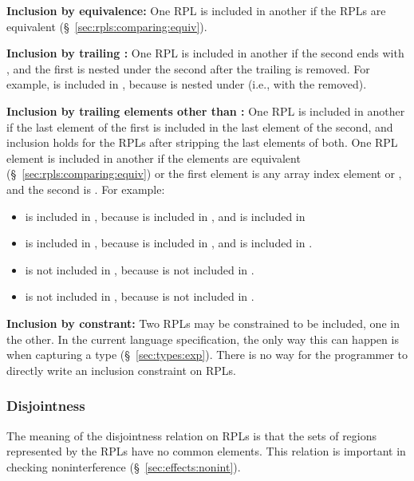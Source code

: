 \noindent
\textbf{Inclusion by equivalence:}  One RPL is included in another if
the RPLs are equivalent (\S~\ref{sec:rpls:comparing:equiv}).

\noindent
\textbf{Inclusion by trailing \kwd{*}:} One RPL is included in another
if the second ends with \kwd{*}, and the first is nested under the
second after the trailing \kwd{*} is removed.  For example,
 is included in , because  is nested
under  (i.e.,  with the \kwd{*} removed).

\noindent
\textbf{Inclusion by trailing elements other than \kwd{*}:} One RPL is
included in another if the last element of the first is included in
the last element of the second, and inclusion holds for the RPLs after
stripping the last elements of both.  One RPL element is included in
another if the elements are equivalent
(\S~\ref{sec:rpls:comparing:equiv}) or the first element is any array
index element or \kwd{[?]}, and the second is \kwd{[?]}.  For example:
%
\begin{itemize}
%
\item {} is included in , because  is
  included in , and  is included in 
%
\item {} is included in , because \kwd{[0]} is
  included in \kwd{[?]}, and  is included in .
%
\item {} is not included in , because  is
  not included in .
%
\item {} is not included in , because \kwd{[?]}
  is not included in \kwd{[0]}.
%
\end{itemize}

\noindent
\textbf{Inclusion by constrant:} Two RPLs may be constrained to be
included, one in the other.  In the current language specification,
the only way this can happen is when capturing a type
(\S~\ref{sec:types:exp}).  There is no way for the programmer to
directly write an inclusion constraint on RPLs.

\subsubsection{Disjointness%
\label{sec:rpls:comparing:disjoint}}

The meaning of the disjointness relation on RPLs is that the sets of
regions represented by the RPLs have no common elements.  This
relation is important in checking noninterference
(\S~\ref{sec:effects:nonint}).

